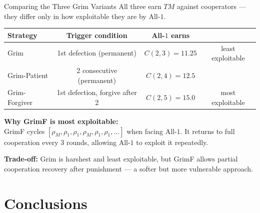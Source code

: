 \documentclass[aspectratio=169]{beamer}
\begin{document}
\begin{frame}{Comparing the Three Grim Variants}
  All three earn $TM$ against cooperators --- they differ only in how exploitable they are by All-$1$.

  \begin{center}
  \begin{tabular}{lccc}
    \toprule
    Strategy & Trigger condition & All-$1$ earns & \\ 
    \midrule
    Grim          & 1st defection (permanent)     & $C(2,3) = 11.25$ & least exploitable \\
    Grim-Patient  & 2 consecutive (permanent)     & $C(2,4) = 12.5$  & \\
    Grim-Forgiver & 1st defection, forgive after 2 & $C(2,5) = 15.0$  & most exploitable  \\
    \bottomrule
  \end{tabular}
  \end{center}

  \vspace{6pt}
  \textbf{Why GrimF is most exploitable:}\\
  GrimF cycles $[\rho_M, \rho_1, \rho_1, \rho_M, \rho_1, \rho_1, \ldots]$ when facing All-$1$.
  It returns to full cooperation every 3 rounds, allowing All-$1$ to exploit it repeatedly.

  \vspace{6pt}
  \textbf{Trade-off:} Grim is harshest and least exploitable, but GrimF allows partial cooperation recovery after punishment --- a softer but more vulnerable approach.
\end{frame}

\section{Conclusions}
\end{document}
